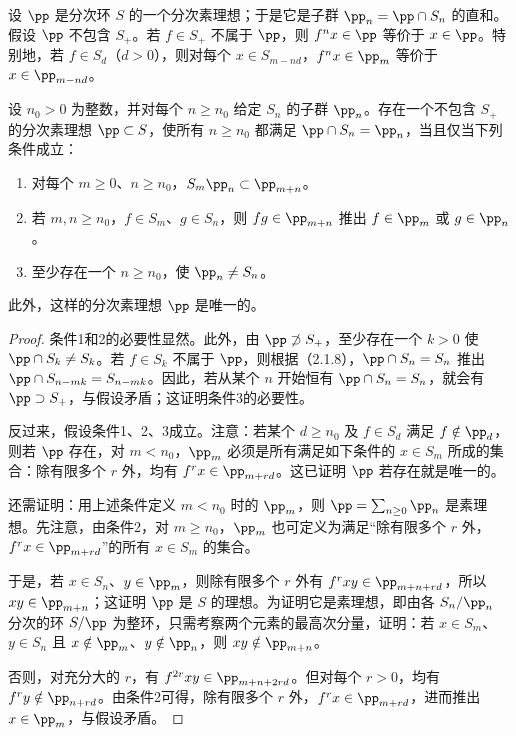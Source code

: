 设 $\pp$ 是分次环 $S$ 的一个分次素理想；于是它是子群
$\pp_n=\pp\cap S_n$ 的直和。假设 $\pp$ 不包含 $S_+$。若 $f\in S_+$ 不属于 $\pp$，则 $f^nx\in\pp$ 等价于 $x\in\pp$。特别地，若 $f\in S_d$（$d>0$），则对每个 $x\in S_{m-nd}$，$f^nx\in\pp_m$ 等价于 $x\in\pp_{m-nd}$。

设 $n_0>0$ 为整数，并对每个 $n\geq n_0$ 给定 $S_n$ 的子群 $\pp_n$。存在一个不包含 $S_+$ 的分次素理想 $\pp\subset S$，使所有 $n\geq n_0$ 都满足 $\pp\cap S_n=\pp_n$，当且仅当下列条件成立：
\begin{enumerate}[label=\arabic*${}^{\circ}$]
\item 对每个 $m\geq0$、$n\geq n_0$，$S_m\pp_n\subset\pp_{m+n}$。
\item 若 $m,n\geq n_0$，$f\in S_m$、$g\in S_n$，则 $fg\in\pp_{m+n}$ 推出 $f\in\pp_m$ 或 $g\in\pp_n$。
\item 至少存在一个 $n\geq n_0$，使 $\pp_n\ne S_n$。
\end{enumerate}
此外，这样的分次素理想 $\pp$ 是唯一的。
\begin{proof}
条件1和2的必要性显然。此外，由 $\pp\not\supset S_+$，至少存在一个 $k>0$ 使 $\pp\cap S_k\ne S_k$。若 $f\in S_k$ 不属于 $\pp$，则根据（2.1.8），$\pp\cap S_n=S_n$ 推出
$\pp\cap S_{n-mk}=S_{n-mk}$。因此，若从某个 $n$ 开始恒有 $\pp\cap S_n=S_n$，就会有 $\pp\supset S_+$，与假设矛盾；这证明条件3的必要性。

反过来，假设条件1、2、3成立。注意：若某个 $d\geq n_0$ 及 $f\in S_d$ 满足 $f\notin\pp_d$，则若 $\pp$ 存在，对 $m<n_0$，$\pp_m$ 必须是所有满足如下条件的 $x\in S_m$ 所成的集合：除有限多个 $r$ 外，均有
$f^rx\in\pp_{m+rd}$。这已证明 $\pp$ 若存在就是唯一的。

还需证明：用上述条件定义 $m<n_0$ 时的 $\pp_m$，则
$\pp=\sum_{n\geq0}\pp_n$ 是素理想。先注意，由条件2，对 $m\geq n_0$，$\pp_m$ 也可定义为满足“除有限多个 $r$ 外，$f^rx\in\pp_{m+rd}$”的所有 $x\in S_m$ 的集合。

于是，若 $x\in S_n$、$y\in\pp_m$，则除有限多个 $r$ 外有
$f^rxy\in\pp_{m+n+rd}$，所以 $xy\in\pp_{m+n}$；这证明 $\pp$ 是 $S$ 的理想。为证明它是素理想，即由各 $S_n/\pp_n$ 分次的环 $S/\pp$ 为整环，只需考察两个元素的最高次分量，证明：若 $x\in S_m$、$y\in S_n$ 且 $x\notin\pp_m$、$y\notin\pp_n$，则 $xy\notin\pp_{m+n}$。

否则，对充分大的 $r$，有 $f^{2r}xy\in\pp_{m+n+2rd}$。但对每个 $r>0$，均有 $f^ry\notin\pp_{n+rd}$。由条件2可得，除有限多个 $r$ 外，$f^rx\in\pp_{m+rd}$，进而推出 $x\in\pp_m$，与假设矛盾。
\end{proof}


